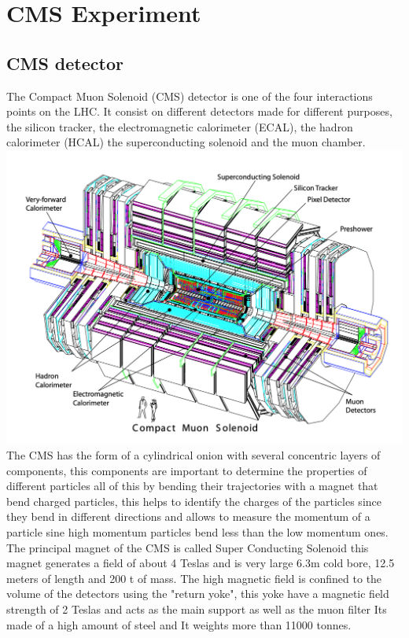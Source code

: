 \chapter{CMS Experiment}
\label{ch2}

\section{CMS detector}

The Compact Muon Solenoid (CMS) detector is one of the four interactions points on the LHC. It consist on different detectors made for different purposes, the silicon tracker, the electromagnetic calorimeter (ECAL), the hadron calorimeter (HCAL) the superconducting solenoid and the muon chamber. 
\\
\includegraphics[scale=0.50]{cms2.png}
\\
The CMS has the form of a cylindrical onion with several concentric layers of components, this components are important to determine the properties of different particles all of this by bending their trajectories with a magnet that bend charged particles, this helps to identify the charges of the particles since they bend in different directions and allows to measure the momentum of a particle sine high momentum particles bend less than the low momentum ones. The principal magnet of the CMS is called Super Conducting Solenoid this magnet generates a field of about 4 Teslas and is very large 6.3m cold bore, 12.5 meters of length and 200 t of mass. The high magnetic field is confined to the volume of the detectors using the "return yoke", this yoke have a magnetic field strength of 2 Teslas and acts as the main support as well as the muon filter Its made of a high amount of steel and It weights more than 11000 tonnes.     \cite{CMS3}

